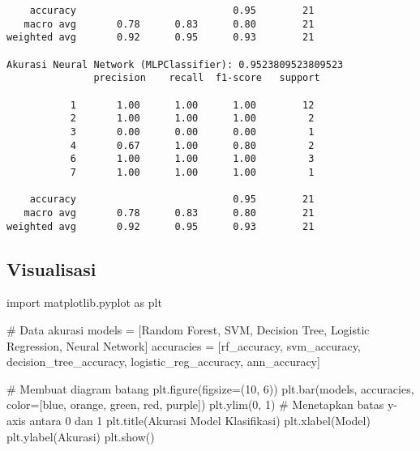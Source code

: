 \documentclass[
  letterpaper,
]{krantz}
\makeatletter
\newenvironment{Shaded}{\begin{snugshade}}{\end{snugshade}}
\newcommand{\CommentTok}[1]{\textcolor[rgb]{0.37,0.37,0.37}{#1}}
\newcommand{\DecValTok}[1]{\textcolor[rgb]{0.68,0.00,0.00}{#1}}
\newcommand{\ImportTok}[1]{\textcolor[rgb]{0.00,0.46,0.62}{#1}}
\newcommand{\NormalTok}[1]{\textcolor[rgb]{0.00,0.23,0.31}{#1}}
\newcommand{\OperatorTok}[1]{\textcolor[rgb]{0.37,0.37,0.37}{#1}}
\newcommand{\StringTok}[1]{\textcolor[rgb]{0.13,0.47,0.30}{#1}}
\newenvironment{kframe}{%
\medskip{}
\setlength{\fboxsep}{.8em}
 \def\at@end@of@kframe{}%
 \ifinner\ifhmode%
  \def\at@end@of@kframe{\end{minipage}}%
  \begin{minipage}{\columnwidth}%
 \fi\fi%
 \def\FrameCommand##1{\hskip\@totalleftmargin \hskip-\fboxsep
 \colorbox{shadecolor}{##1}\hskip-\fboxsep
     \hskip-\linewidth \hskip-\@totalleftmargin \hskip\columnwidth}%
 \MakeFramed {\advance\hsize-\width
   \@totalleftmargin\z@ \linewidth\hsize
   \@setminipage}}%
 {\par\unskip\endMakeFramed%
 \at@end@of@kframe}
\renewenvironment{Shaded}{\begin{kframe}}{\end{kframe}}
\makeatother
\begin{document}
\begin{verbatim}
    accuracy                           0.95        21
   macro avg       0.78      0.83      0.80        21
weighted avg       0.92      0.95      0.93        21

Akurasi Neural Network (MLPClassifier): 0.9523809523809523 
               precision    recall  f1-score   support

           1       1.00      1.00      1.00        12
           2       1.00      1.00      1.00         2
           3       0.00      0.00      0.00         1
           4       0.67      1.00      0.80         2
           6       1.00      1.00      1.00         3
           7       1.00      1.00      1.00         1

    accuracy                           0.95        21
   macro avg       0.78      0.83      0.80        21
weighted avg       0.92      0.95      0.93        21
\end{verbatim}

\hypertarget{visualisasi-1}{%
\subsection{Visualisasi}\label{visualisasi-1}}

\begin{Shaded}
\begin{Highlighting}[]
\ImportTok{import}\NormalTok{ matplotlib.pyplot }\ImportTok{as}\NormalTok{ plt}

\CommentTok{\# Data akurasi}
\NormalTok{models }\OperatorTok{=}\NormalTok{ [}\StringTok{\textquotesingle{}Random Forest\textquotesingle{}}\NormalTok{, }\StringTok{\textquotesingle{}SVM\textquotesingle{}}\NormalTok{, }\StringTok{\textquotesingle{}Decision Tree\textquotesingle{}}\NormalTok{, }\StringTok{\textquotesingle{}Logistic Regression\textquotesingle{}}\NormalTok{, }\StringTok{\textquotesingle{}Neural Network\textquotesingle{}}\NormalTok{]}
\NormalTok{accuracies }\OperatorTok{=}\NormalTok{ [rf\_accuracy, svm\_accuracy, decision\_tree\_accuracy, logistic\_reg\_accuracy, ann\_accuracy]}

\CommentTok{\# Membuat diagram batang}
\NormalTok{plt.figure(figsize}\OperatorTok{=}\NormalTok{(}\DecValTok{10}\NormalTok{, }\DecValTok{6}\NormalTok{))}
\NormalTok{plt.bar(models, accuracies, color}\OperatorTok{=}\NormalTok{[}\StringTok{\textquotesingle{}blue\textquotesingle{}}\NormalTok{, }\StringTok{\textquotesingle{}orange\textquotesingle{}}\NormalTok{, }\StringTok{\textquotesingle{}green\textquotesingle{}}\NormalTok{, }\StringTok{\textquotesingle{}red\textquotesingle{}}\NormalTok{, }\StringTok{\textquotesingle{}purple\textquotesingle{}}\NormalTok{])}
\NormalTok{plt.ylim(}\DecValTok{0}\NormalTok{, }\DecValTok{1}\NormalTok{)  }\CommentTok{\# Menetapkan batas y{-}axis antara 0 dan 1}
\NormalTok{plt.title(}\StringTok{\textquotesingle{}Akurasi Model Klasifikasi\textquotesingle{}}\NormalTok{)}
\NormalTok{plt.xlabel(}\StringTok{\textquotesingle{}Model\textquotesingle{}}\NormalTok{)}
\NormalTok{plt.ylabel(}\StringTok{\textquotesingle{}Akurasi\textquotesingle{}}\NormalTok{)}
\NormalTok{plt.show()}
\end{Highlighting}
\end{Shaded}
\end{document}
